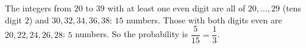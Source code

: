 The integers from $20$ to $39$ with at least one even digit are all of $20,\ldots,29$ (tens digit $2$) and $30,32,34,36,38$: $15$ numbers. Those with both digits even are $20,22,24,26,28$: $5$ numbers. So the probability is $\dfrac{5}{15}=\boxed{\dfrac{1}{3}}$.
